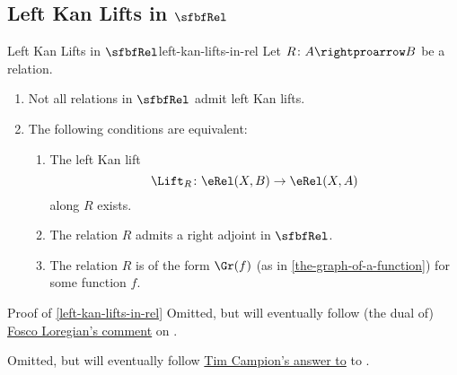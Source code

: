 \subsection{Left Kan Lifts in $\sfbfRel$}\label{subsection-left-kan-lifts-in-rel}
\begin{proposition}{Left Kan Lifts in $\sfbfRel$}{left-kan-lifts-in-rel}%
    Let $R\colon A\rightproarrow B$ be a relation.
    \begin{enumerate}
        \item\label{left-kan-lifts-in-rel-non-existence-of-all-left-kan-lifts-in-rel}Not all relations in $\sfbfRel$ admit left Kan lifts.
        \item\label{left-kan-lifts-in-rel-characterisation-of-relations-admitting-left-kan-lifts-along-them}The following conditions are equivalent:
            \begin{enumerate}
                \item\label{left-kan-lifts-in-rel-characterisation-of-relations-admitting-left-kan-lifts-along-them-1}The left Kan lift
                    \[
                        \Lift_{R}%
                        \colon%
                        \eRel(X,B)%
                        \to%
                        \eRel(X,A)%
                    \]%
                    along $R$ exists.
                \item\label{left-kan-lifts-in-rel-characterisation-of-relations-admitting-left-kan-lifts-along-them-2}The relation $R$ admits a right adjoint in $\sfbfRel$.
                \item\label{left-kan-lifts-in-rel-characterisation-of-relations-admitting-left-kan-lifts-along-them-3}The relation $R$ is of the form $\Gr(f)$ (as in \cref{the-graph-of-a-function}) for some function $f$.
            \end{enumerate}
    \end{enumerate}
\end{proposition}
\begin{Proof}{Proof of \cref{left-kan-lifts-in-rel}}%
    Omitted, but will eventually follow (the dual of) \href{https://mathoverflow.net/questions/460656/existence-and-characterisations-of-left-kan-lifts-and-liftings-in-the-bicat#comment1194691_460656}{Fosco Loregian's comment} on \cite{MO460656}.

    Omitted, but will eventually follow \href{https://mathoverflow.net/a/460693}{Tim Campion's answer to} to \cite{MO460656}.
\end{Proof}

